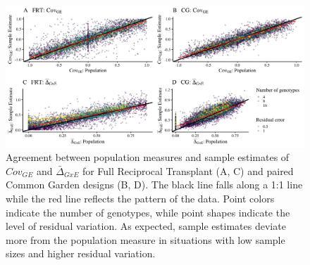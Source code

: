 \documentclass[11pt, oneside]{amsart}
\begin{document}
\clearpage
\newpage

\renewcommand{\figurename}{Supplementary Figure}

\renewcommand\thefigure{S2}
\begin{figure}[h]
\begin{center}
\includegraphics[width=6in]{3.11.SampleVsPopulation.jpeg}
\end{center}
\label{Fig: Population vs. Sample Estimates}
\caption{Agreement between population measures and sample estimates of $Cov_{GE}$ and $\bar\Delta_{GxE}$ for Full Reciprocal Transplant (A, C) and paired Common Garden designs (B, D). The black line falls along a 1:1 line while the red line reflects the pattern of the data. Point colors indicate the number of genotypes, while point shapes indicate the level of residual variation. As expected, sample estimates deviate more from the population measure in situations with low sample sizes and higher residual variation.}
\end{figure}
\end{document}
